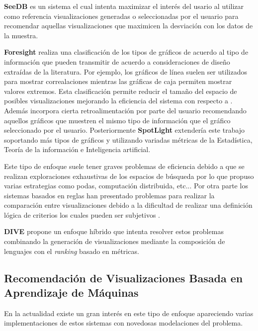 \textbf{SeeDB} \cite{vartak2014seedb} es un sistema el cual intenta maximizar el inter\'es del usario
al utilizar como referencia visualizaciones generadas o seleccionadas por el usuario
para recomendar aquellas visualizaciones que maximicen la desviaci\'on con los datos de la muestra.

\textbf{Foresight} \cite{demiralp2017foresight} realiza una clasificaci\'on de los tipos de gr\'aficos de
acuerdo al tipo de informaci\'on que pueden transmitir de acuerdo a consideraciones de dise\~no extra\'idas
de la literatura. Por ejemplo, los gr\'aficos de l\'inea suelen ser utilizados para mostrar correalaciones
mientras las gr\'aficas de caja permiten mostrar valores extremos. Esta clasificaci\'on permite reducir el tama\~no
del espacio de posibles visualizaciones mejorando la eficiencia del sistema con respecto a \cite{seo2004rank}.
Adem\'as incorpora cierta retroalimentaci\'on por
parte del usuario recomendando aquellos gr\'aficos que muestren el mismo tipo de informaci\'on que el gr\'afico
seleccionado por el usuario. Posteriormente \textbf{SpotLight} \cite{harris2021insight} extender\'ia este trabajo soportando
m\'as tipos de gr\'aficos y utilizando variadas m\'etricas de la Estad\'istica, Teor\'ia de la informaci\'on e Inteligencia artificial.

Este tipo de enfoque suele tener graves problemas de eficiencia debido a que se realizan exploraciones exhaustivas de los
espacios de b\'usqueda por lo que \cite{vartak2014seedb} propuso varias estrategias como podas, computaci\'on distribuida, etc...
Por otra parte los sistemas basados en reglas han presentado problemas para realizar la comparaci\'on entre visualizaciones debido
a la dificultad de realizar una definici\'on l\'ogica de criterios los cuales pueden ser subjetivos \cite{vartak2017towards}.

\textbf{DIVE} \cite{hu2018dive} propone un enfoque h\'ibrido que intenta resolver estos problemas combinando
la generaci\'on de visualizaciones mediante la composici\'on de lenguajes con el \textit{ranking} basado en m\'etricas. 

\subsection{Recomendaci\'on de Visualizaciones Basada en Aprendizaje de M\'aquinas}\label{subsection:ml-viz-rec}
En la actualidad existe un gran inter\'es en este tipo de enfoque apareciendo varias implementaciones
de estos sistemas con novedosas modelaciones del problema. 

